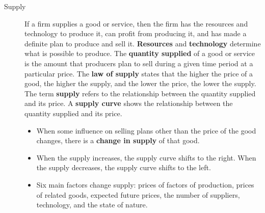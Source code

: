 \documentclass{article}
\begin{document}
\begin{description}
    \item [Supply] If a firm supplies a good or service, then the firm has the resources and technology to produce it, can profit from producing it, and has made a definite plan to produce and sell it. \textbf{Resources} and \textbf{technology} determine what is possible to produce. The \textbf{quantity supplied} of a good or service is the amount that producers plan to sell during a given time period at a particular price. The \textbf{law of supply} states that the higher the price of a good, the higher the supply, and the lower the price, the lower the supply. The term \textbf{supply} refers to the relationship between the quantity supplied and its price. A \textbf{supply curve} shows the relationship between the quantity supplied and its price.
    \begin{itemize}
        \item When some influence on selling plans other than the price of the good changes, there is a \textbf{change in supply} of that good.
        \item When the supply increases, the supply curve shifts to the right. When the supply decreases, the supply curve shifts to the left.
        \item Six main factors change supply: prices of factors of production, prices of related goods, expected future prices, the number of suppliers, technology, and the state of nature.
    \end{itemize}
\end{description}
\end{document}
